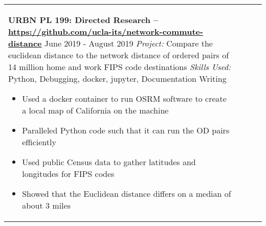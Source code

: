 \documentclass[10pt]{article}
\newcommand*\leftright[2]{%
  \leavevmode
  \rlap{#1}%
  \hspace{0.5\linewidth}%
  #2}
\begin{document}
\begin{longtable}{l l l l}
{        \textbf{URBN PL 199: Directed Research -- 
        \href{https://github.com/ucla-its/network-commute-distance}{https://github.com/ucla-its/network-commute-distance}} \newline
        \leftright{\textit{Advisor:} Evelyn Blumenberg}{June 2019 - August 2019} \newline
        \textit{Project:} Compare the euclidean distance to the network distance of ordered pairs of 14 million home and work FIPS code destinations \newline
        \textit{Skills Used:} Python, Debugging, docker, jupyter, Documentation Writing
        \begin{itemize}[noitemsep,nolistsep]
            \item Used a docker container to run OSRM software to create a local map of California on the machine
            \item Paralleled Python code such that it can run the OD pairs efficiently
            \item Used public Census data to gather latitudes and longitudes for FIPS codes
            \item Showed that the Euclidean distance differs on a median of about 3 miles
        \end{itemize}
        
        \baselineskip}
\end{longtable}
\end{document}
